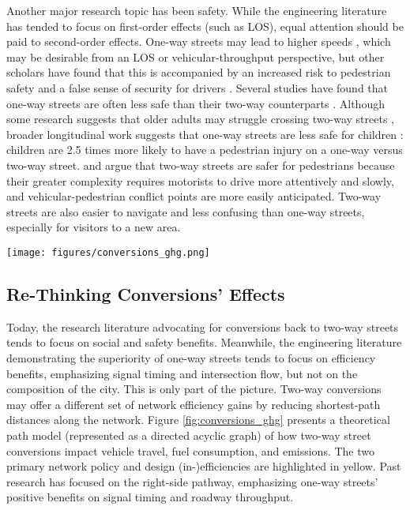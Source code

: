\documentclass{article}
\begin{document}
Another major research topic has been safety. While the engineering literature has tended to focus on first-order effects (such as LOS), equal attention should be paid to second-order effects. One-way streets may lead to higher speeds \citep{schneider_pedestrian_2013}, which may be desirable from an LOS or vehicular-throughput perspective, but other scholars have found that this is accompanied by an increased risk to pedestrian safety \citep{swift_residential_1998} and a false sense of security for drivers \citep{holahan_psychological_2013}. Several studies have found that one-way streets are often less safe than their two-way counterparts \citep{ewing_urban_2003,riggs_two-way_2016,ewing_built_2009}. Although some research suggests that older adults may struggle crossing two-way streets \citep{dommes_functional_2013}, broader longitudinal work suggests that one-way streets are less safe for children \citep{wazana_are_2000}: children are 2.5 times more likely to have a pedestrian injury on a one-way versus two-way street. \citet{gayah_two-way_2012} and \citet{gayah_analytical_2012} argue that two-way streets are safer for pedestrians because their greater complexity requires motorists to drive more attentively and slowly, and vehicular-pedestrian conflict points are more easily anticipated. Two-way streets are also easier to navigate and less confusing than one-way streets, especially for visitors to a new area.

\begin{figure*}[tbp]
	\centering
	\texttt{[image: figures/conversions\_ghg.png]}
	\caption{Theoretical model of one-way to two-way street conversions' effects on vehicle travel, fuel consumption, and emissions.}
	\label{fig:conversions_ghg}
\end{figure*}

\subsection{Re-Thinking Conversions' Effects}

Today, the research literature advocating for conversions back to two-way streets tends to focus on social and safety benefits. Meanwhile, the engineering literature demonstrating the superiority of one-way streets tends to focus on efficiency benefits, emphasizing signal timing and intersection flow, but not on the composition of the city. This is only part of the picture. Two-way conversions may offer a different set of network efficiency gains by reducing shortest-path distances along the network. Figure \ref{fig:conversions_ghg} presents a theoretical path model (represented as a directed acyclic graph) of how two-way street conversions impact vehicle travel, fuel consumption, and emissions. The two primary network policy and design (in-)efficiencies are highlighted in yellow. Past research has focused on the right-side pathway, emphasizing one-way streets' positive benefits on signal timing and roadway throughput.
\end{document}
